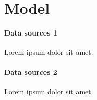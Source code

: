 \documentclass[main.tex]{subfiles}
\begin{document}
\section{Model}\label{s:model}

\paragraph{Data sources 1} Lorem ipsum dolor sit amet.

\paragraph{Data sources 2} Lorem ipsum dolor sit amet.
\end{document}
